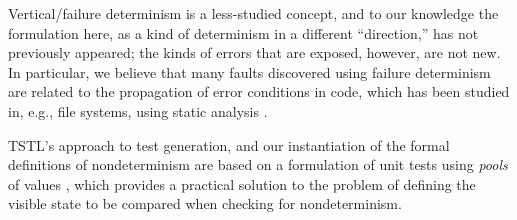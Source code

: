 Vertical/failure determinism is a less-studied concept, and to our knowledge the formulation here, as a kind of determinism in a different ``direction,'' has not previously appeared; the kinds of errors that are exposed, however, are not new.  In particular, we believe that many faults discovered using failure determinism are related to the propagation of error conditions in code, which has been studied in, e.g., file systems, using static analysis \cite{FileProp}.

TSTL's approach to test generation, and our instantiation of the formal definitions of nondeterminism are based on a formulation of unit tests using \emph{pools} of values \cite{AndrewsTR}, which provides a practical solution to the problem of defining the visible state to be compared when checking for nondeterminism.

\begin{comment}
Finally, Cotroneo et al. \cite{CompBugs,FaultTriggers}, and Grottke and Trivedi \cite{GrottkeBugs} have followed on early work on understanding bugs and how they manifest, including transient \cite{Transient} software faults.  This work informs our attempt to identify sources of nondeterminism, and should provide other, context and project-specific, sources that could be introduced into our general framework.
\end{comment}